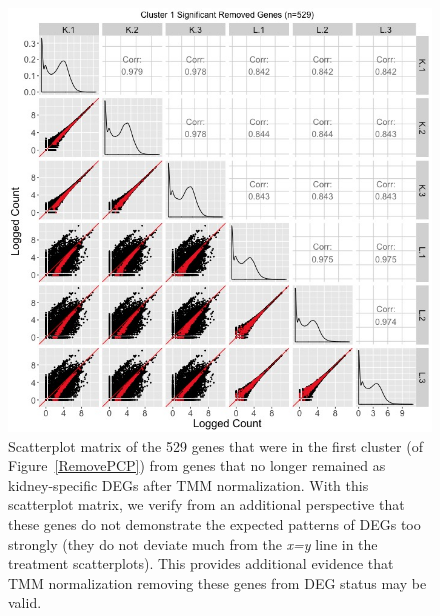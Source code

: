\documentclass{article}
\begin{document}
\null
\begin{figure}[t!]
\centerline{\includegraphics[width=1\columnwidth]{../MakeFigures/lkClustersRemoveSM.jpg}}
\caption{Scatterplot matrix of the 529 genes that were in the first cluster (of Figure~\ref{RemovePCP}) from genes that no longer remained as kidney-specific DEGs after TMM normalization. With this scatterplot matrix, we verify from an additional perspective that these genes do not demonstrate the expected patterns of DEGs too strongly (they do not deviate much from the \textit{x=y} line in the treatment scatterplots). This provides additional evidence that TMM normalization removing these genes from DEG status may be valid.
\label{lkClustersRemoveSM}}
\end{figure}
\end{document}
